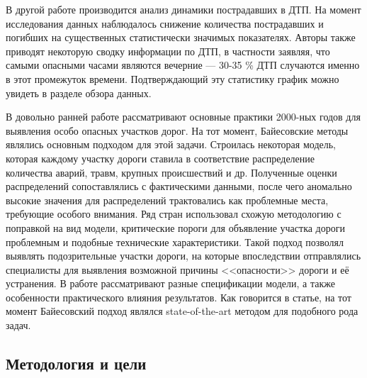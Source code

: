 \documentclass[a4paper, 14pt]{article}
\begin{document}
В другой работе \cite{konyuhov2015analysis} производится анализ динамики пострадавших в ДТП. На момент исследования данных наблюдалось снижение количества пострадавших и погибших на существенных статистически значимых показателях. Авторы также приводят некоторую сводку информации по ДТП, в частности заявляя, что самыми опасными часами являются вечерние --- 30-35 \% ДТП случаются именно в этот промежуток времени. Подтверждающий эту статистику график можно увидеть в разделе обзора данных. 

В довольно ранней работе \cite{elvik2007state} рассматривают основные практики 2000-ных годов для выявления особо опасных участков дорог. На тот момент, Байесовские методы являлись основным подходом для этой задачи. Строилась некоторая модель, которая каждому участку дороги ставила в соответствие распределение количества аварий, травм, крупных происшествий и др. Полученные оценки распределений сопоставлялись с фактическими данными, после чего аномально высокие значения для распределений трактовались как проблемные места, требующие особого внимания. Ряд стран использовал схожую методологию с поправкой на вид модели, критические пороги для объявление участка дороги проблемным и подобные технические характеристики. Такой подход позволял выявлять подозрительные участки дороги, на которые впоследствии отправлялись специалисты для выявления возможной причины <<опасности>> дороги и её устранения. В работе рассматривают разные спецификации модели, а также особенности практического влияния результатов. Как говорится в статье, на тот момент Байесовский подход являлся state-of-the-art методом для подобного рода задач.


\subsection{Методология и цели}




\newpage
\end{document}
